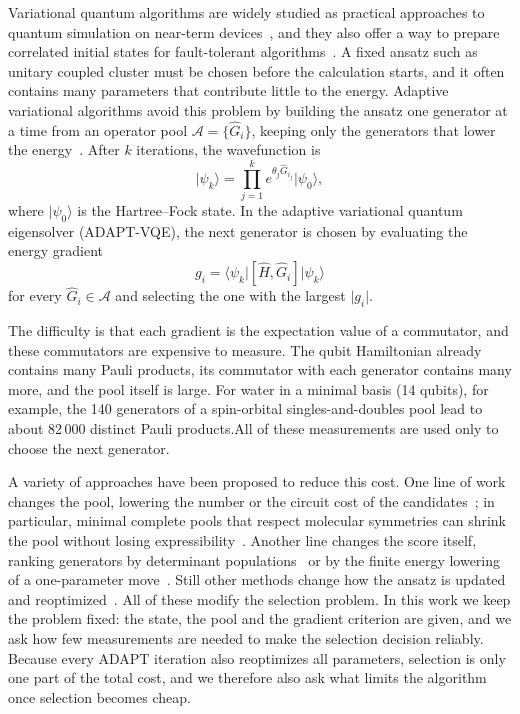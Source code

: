 \documentclass[aps,pra,reprint,superscriptaddress,nofootinbib]{revtex4-2}
\begin{document}
Variational quantum algorithms are widely studied as practical approaches to quantum simulation on near-term devices~\cite{cerezo2021}, and they also offer a way to prepare correlated initial states for fault-tolerant algorithms~\cite{choi2024}. A fixed ansatz such as unitary coupled cluster must be chosen before the calculation starts, and it often contains many parameters that contribute little to the energy. Adaptive variational algorithms avoid this problem by building the ansatz one generator at a time from an operator pool $\mathcal{A}=\{\hat G_i\}$, keeping only the generators that lower the energy~\cite{grimsley2019}. After $k$ iterations, the wavefunction is
\begin{equation}
\lvert\psi_k\rangle=\prod_{j=1}^{k}e^{\theta_j\hat G_{i_j}}\lvert\psi_0\rangle ,
\label{eq:ansatz}
\end{equation}
where $\lvert\psi_0\rangle$ is the Hartree--Fock state. In the adaptive variational quantum eigensolver (ADAPT-VQE), the next generator is chosen by evaluating the energy gradient
\begin{equation}
g_i=\langle\psi_k\rvert[\hat H,\hat G_i]\lvert\psi_k\rangle
\label{eq:grad}
\end{equation}
for every $\hat G_i\in\mathcal{A}$ and selecting the one with the largest $\lvert g_i\rvert$.

The difficulty is that each gradient is the expectation value of a commutator, and these commutators are expensive to measure. The qubit Hamiltonian already contains many Pauli products, its commutator with each generator contains many more, and the pool itself is large. For water in a minimal basis (14 qubits), for example, the 140 generators of a spin-orbital singles-and-doubles pool lead to about 82\,000 distinct Pauli products.All of these measurements are used only to choose the next generator.

A variety of approaches have been proposed to reduce this cost. One line of work changes the pool, lowering the number or the circuit cost of the candidates~\cite{tang2021,yordanov2021,vandyke2024,ramoa2025ceo}; in particular, minimal complete pools that respect molecular symmetries can shrink the pool without losing expressibility~\cite{shkolnikov2023}. Another line changes the score itself, ranking generators by determinant populations~\cite{majland2023} or by the finite energy lowering of a one-parameter move~\cite{feniou2025,jager2025,rossi2026}. Still other methods change how the ansatz is updated and reoptimized~\cite{anastasiou2024tetris,stadelmann2025,ramoa2025hessian,ramoa2026co}. All of these modify the selection problem. In this work we keep the problem fixed: the state, the pool and the gradient criterion are given, and we ask how few measurements are needed to make the selection decision reliably. Because every ADAPT iteration also reoptimizes all parameters, selection is only one part of the total cost, and we therefore also ask what limits the algorithm once selection becomes cheap.
\end{document}
